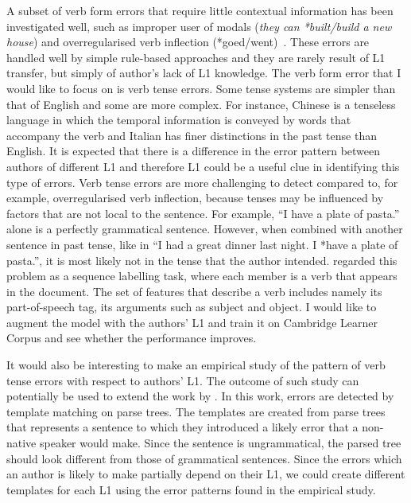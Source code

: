\documentclass[11pt]{article}
\begin{document}
A subset of verb form errors that require little contextual information has been investigated well, such as improper user of modals (\emph{they can *built/build a new house}) and overregularised verb inflection (*goed/went)~\citep{chodorow2000unsupervised, leacock2003automated}. These errors are handled well by simple rule-based approaches and they are rarely result of L1 transfer, but simply of author's lack of L1 knowledge. The verb form error that I would like to focus on is verb tense errors. Some tense systems are simpler than that of English and some are more complex. For instance, Chinese is a tenseless language in which the temporal information is conveyed by words that accompany the verb and Italian has finer distinctions in the past tense than English. It is expected that there is a difference in the error pattern between authors of different L1 and therefore L1 could be a useful clue in identifying this type of errors. Verb tense errors are more challenging to detect compared to, for example, overregularised verb inflection, because tenses may be influenced by factors that are not local to the sentence. For example, ``I have a plate of pasta.'' alone is a perfectly grammatical sentence. However, when combined with another sentence in past tense, like in ``I had a great dinner last night. I *have a plate of pasta.'', it is most likely not in the tense that the author intended. \cite{tajiri2012tense} regarded this problem as a sequence labelling task, where each member is a verb that appears in the document. The set of features that describe a verb includes namely its part-of-speech tag, its arguments such as subject and object. I would like to augment the model with the authors' L1 and train it on Cambridge Learner Corpus and see whether the performance improves.

It would also be interesting to make an empirical study of the pattern of verb tense errors with respect to authors' L1. The outcome of such study can potentially be used to extend the work by \cite{lee2008correcting}. In this work, errors are detected by template matching on parse trees. The templates are created from parse trees that represents a sentence to which they introduced a likely error that a non-native speaker would make. Since the sentence is ungrammatical, the parsed tree should look different from those of grammatical sentences. Since the errors which an author is likely to make partially depend on their L1, we could create different templates for each L1 using the error patterns found in the empirical study.
\end{document}
